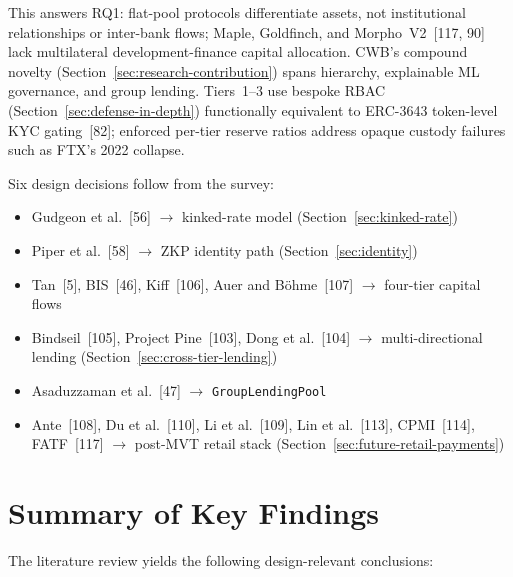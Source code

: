 \documentclass[12pt, a4paper]{report}
\begin{document}
This answers RQ1: flat-pool protocols differentiate assets, not institutional relationships or inter-bank flows; Maple, Goldfinch, and Morpho~V2~[117, 90] lack multilateral development-finance capital allocation. CWB's compound novelty (Section~\ref{sec:research-contribution}) spans hierarchy, explainable ML governance, and group lending. Tiers~1--3 use bespoke RBAC (Section~\ref{sec:defense-in-depth}) functionally equivalent to ERC-3643 token-level KYC gating~[82]; enforced per-tier reserve ratios address opaque custody failures such as FTX's 2022 collapse.

Six design decisions follow from the survey:
\begin{itemize}[noitemsep]
\item Gudgeon et al.~[56] $\to$ kinked-rate model (Section~\ref{sec:kinked-rate})
\item Piper et al.~[58] $\to$ ZKP identity path (Section~\ref{sec:identity})
\item Tan~[5], BIS~[46], Kiff~[106], Auer and B\"{o}hme~[107] $\to$ four-tier capital flows
\item Bindseil~[105], Project Pine~[103], Dong et al.~[104] $\to$ multi-directional lending (Section~\ref{sec:cross-tier-lending})
\item Asaduzzaman et al.~[47] $\to$ \texttt{GroupLendingPool}
\item Ante~[108], Du et al.~[110], Li et al.~[109], Lin et al.~[113], CPMI~[114], FATF~[117] $\to$ post-MVT retail stack (Section~\ref{sec:future-retail-payments})
\end{itemize}

\section{Summary of Key Findings}
\label{sec:lit-key-findings}

The literature review yields the following design-relevant conclusions:
\end{document}
